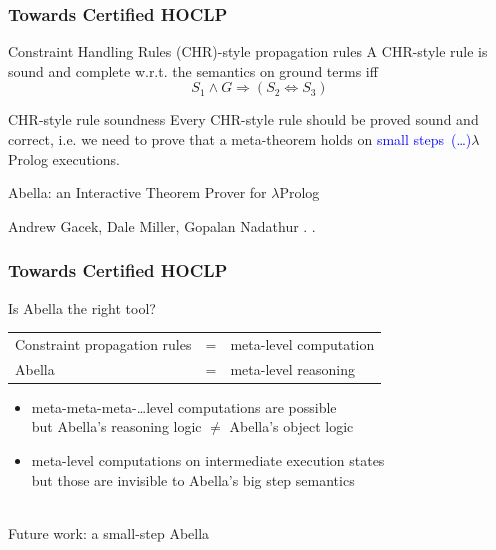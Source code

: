 \documentclass{beamer}
\newcommand{\cblue}[1]{\textcolor{blue}{#1}}
\begin{document}
\begin{frame}[fragile]
 \frametitle{Towards Certified HOCLP}
 \begin{block}{Constraint Handling Rules (CHR)-style propagation rules}
   A CHR-style rule is \alert{sound}
   and \alert{complete} w.r.t. the \alert{semantics on ground terms} iff
   $$S_1 \wedge G \Rightarrow (S_2 \Leftrightarrow S_3)$$
 \end{block}
 \begin{block}{CHR-style rule soundness}
  Every CHR-style rule should be proved sound and correct, i.e. we need to
  prove that a \alert{meta-theorem} holds \alert{on \cblue{small steps~(\ldots)}$\lambda$Prolog executions}.
 \end{block}

 \begin{block}{Abella: an Interactive Theorem Prover for $\lambda$Prolog}
\begin{thebibliography}{1}
Andrew Gacek, Dale Miller, Gopalan Nadathur
.
.
\end{thebibliography}
 \end{block}
\end{frame}

\begin{frame}[fragile]
 \frametitle{Towards Certified HOCLP}
 \begin{block}{Is Abella the right tool?}
   \begin{tabular}{lll}Constraint propagation rules&=&meta-level computation\\
        Abella&=&meta-level reasoning\end{tabular}
  \begin{itemize}
   \item meta-meta-meta-\ldots level computations are possible\\
         but Abella's reasoning logic $\not =$ Abella's object logic
   \item meta-level computations on intermediate execution states\\
         but those are invisible to Abella's big step semantics
  \end{itemize}

  ~\\\alert{Future work: a small-step Abella}
 \end{block}
\end{frame}
\end{document}
